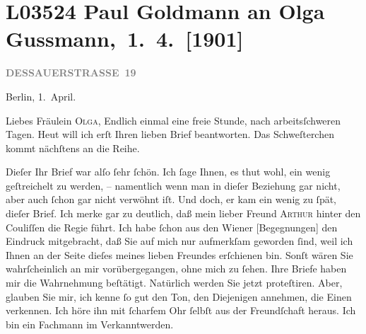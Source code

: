 

\section[ Paul Goldmann an Olga Gussmann, 1. 4. {[}1901{]}]{L03524 Paul Goldmann an Olga Gussmann, 1. 4. {[}1901{]}}
\nopagebreak{}
\rehead{ }\normalsize\beginnumbering{}
\toendnotes[C]{\smallbreak\pagebreak[2]}
\toendnotes[C]{\smallbreak}
\pstart
           \raggedleft{}{\pb}\textcolor{gray}{\textbf{DESSAUERSTRASSE 19}}\pend
           
\pstart
           Berlin, 1. April.\pend
           
\pstart\center{}Liebes Fräulein \textsc{Olga},\pend\vspace{0.5em}
\pstart
           Endlich einmal eine freie Stunde, nach arbeitsſchweren Tagen. Heut will ich erſt Ihren lieben Brief beantworten. Das Schweſterchen kommt nächſtens an die
               Reihe.\pend
           
\pstart
           Dieſer Ihr Brief war alſo ſehr ſchön. Ich ſage Ihnen, es thut wohl, ein wenig
               geſtreichelt zu werden, – namentlich wenn man in dieſer Beziehung gar nicht, aber
               auch ſchon gar nicht verwöhnt iſt. Und doch, er kam ein wenig zu ſpät, dieſer Brief.
               Ich merke gar zu deutlich, daß mein lieber Freund \textsc{Arthur} hinter den Couliſſen die Regie führt. Ich habe ſchon aus den 
               Wiener {[}Begegnungen{]}{ }{\pb}den Eindruck mitgebracht, \strikeout{\textcolor{gray}{×}\-\textcolor{gray}{×}\-\textcolor{gray}{×}} daß Sie auf mich nur aufmerkſam geworden ſind, weil ich Ihnen an der Seite
               dieſes meines lieben Freundes
               erſchienen bin. Sonſt wären Sie wahrſcheinlich an mir vorübergegangen, ohne mich zu
               ſehen. Ihre Briefe haben mir die Wahrnehmung beſtätigt. Natürlich werden Sie jetzt
               proteſtiren. Aber, glauben Sie mir, ich kenne ſo gut den Ton, den Diejenigen
               annehmen, die Einen verkennen. Ich höre ihn mit ſcharfem Ohr ſelbſt aus der
               Freundſchaft heraus. Ich bin ein Fachmann im Verkanntwerden.\pend
           
